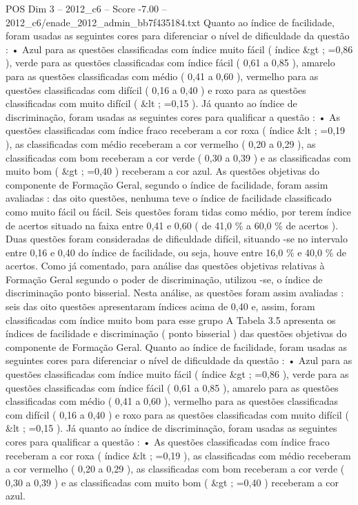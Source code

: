 \begin{textsample}{POS Dim 3 – 2012\_c6 – Score -7.00 – 2012\_c6/enade\_2012\_admin\_bb7f435184.txt}
Quanto ao índice de facilidade, foram usadas as seguintes cores para diferenciar o nível de dificuldade da questão : • Azul para as questões classificadas com índice muito fácil ( índice \&gt ; =0,86 ), verde para as questões classificadas com índice fácil ( 0,61 a 0,85 ), amarelo para as questões classificadas com médio ( 0,41 a 0,60 ), vermelho para as questões classificadas com difícil ( 0,16 a 0,40 ) e roxo para as questões classificadas com muito difícil ( \&lt ; =0,15 ).
Já quanto ao índice de discriminação, foram usadas as seguintes cores para qualificar a questão : • As questões classificadas com índice fraco receberam a cor roxa ( índice \&lt ; =0,19 ), as classificadas com médio receberam a cor vermelho ( 0,20 a 0,29 ), as classificadas com bom receberam a cor verde ( 0,30 a 0,39 ) e as classificadas com muito bom ( \&gt ; =0,40 ) receberam a cor azul.
As questões objetivas do componente de Formação Geral, segundo o índice de facilidade, foram assim avaliadas : das oito questões, nenhuma teve o índice de facilidade classificado como muito fácil ou fácil.
Seis questões foram tidas como médio, por terem índice de acertos situado na faixa entre 0,41 e 0,60 ( de 41,0 \% a 60,0 \% de acertos ).
Duas questões foram consideradas de dificuldade difícil, situando -se no intervalo entre 0,16 e 0,40 do índice de facilidade, ou seja, houve entre 16,0 \% e 40,0 \% de acertos.
Como já comentado, para análise das questões objetivas relativas à Formação Geral segundo o poder de discriminação, utilizou -se, o índice de discriminação ponto bisserial.
Nesta análise, as questões foram assim avaliadas : seis das oito questões apresentaram índices acima de 0,40 e, assim, foram classificadas com índice muito bom para esse grupo A Tabela 3.5 apresenta os índices de facilidade e discriminação ( ponto bisserial ) das questões objetivas do componente de Formação Geral.
Quanto ao índice de facilidade, foram usadas as seguintes cores para diferenciar o nível de dificuldade da questão : • Azul para as questões classificadas com índice muito fácil ( índice \&gt ; =0,86 ), verde para as questões classificadas com índice fácil ( 0,61 a 0,85 ), amarelo para as questões classificadas com médio ( 0,41 a 0,60 ), vermelho para as questões classificadas com difícil ( 0,16 a 0,40 ) e roxo para as questões classificadas com muito difícil ( \&lt ; =0,15 ).
Já quanto ao índice de discriminação, foram usadas as seguintes cores para qualificar a questão : • As questões classificadas com índice fraco receberam a cor roxa ( índice \&lt ; =0,19 ), as classificadas com médio receberam a cor vermelho ( 0,20 a 0,29 ), as classificadas com bom receberam a cor verde ( 0,30 a 0,39 ) e as classificadas com muito bom ( \&gt ; =0,40 ) receberam a cor azul.

\end{textsample}
